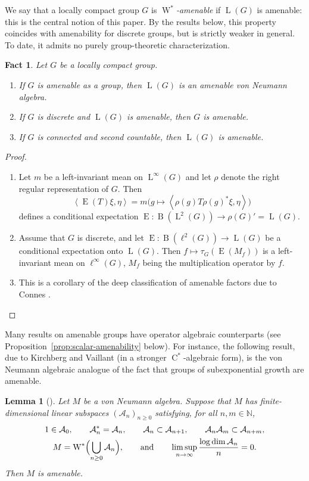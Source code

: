 \documentclass[11pt]{amsart}
\numberwithin{equation}{section}
\newcommand{\nn}{\mathbb N}
\newcommand{\A}{\mathcal A}
\DeclareMathOperator{\LL}{L}
\newcommand{\ps}[2]{\left\langle #1,#2\right\rangle}
\newcommand{\Wstar}{\operatorname{W}^*}
\newcommand{\Cstar}{\operatorname{C}^*}
\newcommand{\rB}{\operatorname{B}}
\newcommand{\rL}{\operatorname{L}}
\newcommand{\rE}{\operatorname{E}}
\newtheorem{Lem}[The]{Lemma}
\newtheorem{fact}[The]{Fact}
\theoremstyle{definition}
\begin{document}
We say that a locally compact group $G$ is \emph{$\Wstar$-amenable} if $\LL(G)$ is amen\-able: this is the central notion of this paper. By the results below, this property coincides with amenability for discrete groups, but is strictly weaker in general. To date, it admits no purely group-theoretic characterization.
\begin{fact} Let $G$ be a locally compact group.
    \begin{enumerate}[\rm (i)]
        \item If $G$ is amenable as a group, then $\LL(G)$ is an amenable von Neumann algebra.
        \item If $G$ is discrete and $\LL(G)$ is amenable, then $G$ is amenable. 
        \item If $G$ is connected and second countable, then $\LL(G)$ is amenable.
    \end{enumerate}
\end{fact}
\begin{proof}
\begin{enumerate}[\rm (i)]
    \item Let $m$ be a left-invariant mean on $\rL^\infty(G)$ and let $\rho$ denote the right regular representation of $G$. Then
    $$
        \ps{\rE(T)\xi}{\eta}=m\big(g\mapsto\ps{\rho(g)T\rho(g)^*\xi}{\eta}\big)
    $$
    defines a conditional expectation $\rE:\rB(\rL^2(G))\to\rho(G)'=\LL(G)$.
    \item Assume that $G$ is discrete, and let $\rE:\rB(\ell^2(G))\to\LL(G)$ be a conditional expectation onto $\LL(G)$. Then $f\mapsto\tau_G(\rE(M_f))$ is a left-invariant mean on $\ell^\infty(G)$, $M_f$ being the multiplication operator by $f$.
    \item This is a corollary of the deep classification of amenable factors due to Connes \cite[Corollary~6.9]{Co76}.\qedhere
\end{enumerate}
\end{proof}

Many results on amenable groups have operator algebraic counterparts (see Proposition~\ref{prop:scalar-amenability} below). For instance, the following result, due to Kirchberg and Vaillant (in a stronger $\Cstar$-algebraic form), is the von Neumann algebraic analogue of the fact that groups of subexponential growth are amenable.

\begin{Lem}[{\cite[Corollary~2.2]{KV92}}]
    \label{lem:ttn-subexponential-amenability}
    Let $M$ be a von Neumann algebra. Suppose that $M$ has finite-dimensional linear subspaces $(\A_n)_{n\geq0}$ satisfying, for all $n,m\in\nn$,
    $$
        \begin{gathered}
            1\in\A_0,\qquad\A_n^*=\A_n,\qquad\A_n\subset\A_{n+1},\qquad\A_n\A_m\subset\A_{n+m},\\
            M=\Wstar\Bigl(\bigcup_{n\geq0}\A_n\Bigr),\qquad\text{and}\qquad\limsup_{n\to\infty}\frac{\log\dim\A_n}{n}=0.
        \end{gathered}
    $$
    Then $M$ is amenable.
\end{Lem}
\end{document}
